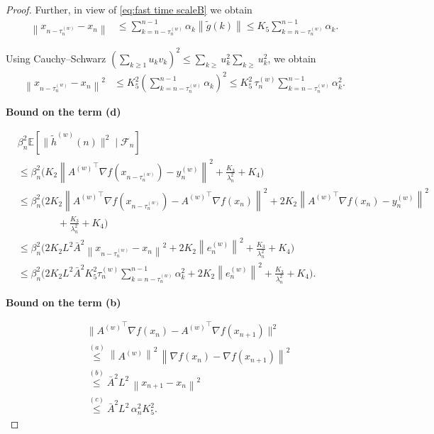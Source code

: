 \documentclass{article}
\newcommand{\norm}[1]{\left\lVert #1 \right\rVert}
\begin{document}
\begin{proof}
Further, in view of \eqref{eq:fast time scaleB} we obtain
\begin{equation*}
\begin{split}
\norm{x_{n-\tau_n^{(w)}} - x_n}
&\le \sum_{k=n-\tau_n^{(w)}}^{n-1} \alpha_k \norm{\widetilde{g}(k)} \le K_5 \sum_{k=n-\tau_n^{(w)}}^{n-1} \alpha_k.
\end{split}
\end{equation*}

Using Cauchy--Schwarz $(\sum\limits_{k \geq 1} u_k v_k)^2 \leq \sum\limits_{k \geq} u_k^2  \sum\limits_{k \geq} u_k^2$, we obtain
\begin{equation*}
\begin{split}
\norm{x_{n-\tau_n^{(w)}} - x_n}^2
&\le K_5^2
\left( \sum_{k=n-\tau_n^{(w)}}^{n-1} \alpha_k \right)^2 \le K_5^2 \, \tau_n^{(w)}
\sum_{k=n-\tau_n^{(w)}}^{n-1} \alpha_k^2.
\end{split}
\end{equation*}

\textbf{Bound on the term (d)}

\begin{equation*}
\begin{split}
& \beta_n^2
\mathbb{E}\!\left[
\|\widetilde{h}^{(w)}(n)\|^2
\mid \mathcal{F}_n
\right] \\
&\le 
\beta_n^2 \Big(
K_2 \norm{
{A^{(w)}}^\top \nabla f(x_{n-\tau_n^{(w)}})
- y_n^{(w)}
}^2
+ \frac{K_3}{\lambda_n^2}
+ K_4
\Big) \\
&\le 
\beta_n^2 \Big(
2 K_2 \norm{
{A^{(w)}}^\top \nabla f(x_{n-\tau_n^{(w)}})
- {A^{(w)}}^\top \nabla f(x_n)
}^2
+ 2 K_2 \norm{
{A^{(w)}}^\top \nabla f(x_n) - y_n^{(w)}
}^2 \\
&\qquad\qquad
+ \frac{K_3}{\lambda_n^2}
+ K_4
\Big) \\
&\le 
\beta_n^2 \Big(
2 K_2 L^2 \bar{A}^2 
\norm{x_{n-\tau_n^{(w)}} - x_n}^2
+ 2 K_2 \norm{e_n^{(w)}}^2
+ \frac{K_3}{\lambda_n^2}
+ K_4
\Big) \\
&\le 
\beta_n^2 \Big(
2 K_2 L^2 \bar{A}^2 K_5^2 \tau_n^{(w)}
\sum_{k=n-\tau_n^{(w)}}^{n-1} \alpha_k^2
+ 2 K_2 \norm{e_n^{(w)}}^2
+ \frac{K_3}{\lambda_n^2}
+ K_4
\Big).
\end{split}
\end{equation*}

\textbf{Bound on the term (b)}

\begin{equation}
\begin{split}
& \| {A^{(w)}}^\top \nabla f(x_n) - {A^{(w)}}^\top \nabla f(x_{n+1})\|^2 \\
&\overset{(a)}{\leq} \norm{A^{(w)}}^2 \, \norm{\nabla f(x_n) - \nabla f(x_{n+1})}^2 \\
&\overset{(b)}{\leq} \bar{A}^2 L^2 \, \norm{x_{n+1}-x_n}^2 \\
&\overset{(c)}{\leq} \bar{A}^2 L^2 \, \alpha_n^2 K_5^2.
\end{split}
\label{ssmothprop}
\end{equation}


\end{proof}
\end{document}
